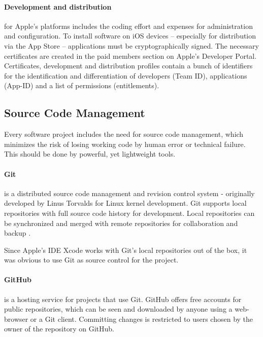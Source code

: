 \paragraph{Development and distribution}
\label{sec:DAD}
for Apple's platforms includes the coding effort and expenses for administration and configuration. 
To install software on iOS devices – especially for distribution via the App Store – applications must be cryptographically signed. 
The necessary certificates are created in the paid members section on Apple's Developer Portal. 
Certificates, development and distribution profiles contain a bunch of identifiers for the identification and differentiation of developers (Team ID), 
applications (App-ID) and a list of permissions (entitlements). 

\subsection{Source Code Management}
\label{sec:SCM}

Every software project includes the need for source code management,
which minimizes the risk of losing working code
by human error or technical failure.
This should be done by powerful, yet lightweight tools.



\paragraph{Git \cite{Git:Main}}
\label{sec:GIT}
is a distributed source code management and revision control system 
- originally developed by Linus Torvalds for Linux kernel development.
Git supports local repositories with full source code history for development.
Local repositories can be synchronized and merged with remote repositories for collaboration and backup
\cite{Chacon:2009:PG:1618548}.

Since Apple's IDE Xcode works with Git's local repositories out of the box,
it was obvious to use Git as source control for the project.

\paragraph{GitHub \cite{GitHub:Main}}
\label{sec.GITHUB}
is a hosting service for projects that use Git. 
GitHub offers free accounts for public repositories, 
which can be seen and downloaded by anyone
using a web-browser or a Git client.
Committing changes is restricted to users chosen by the owner of the repository on GitHub.


